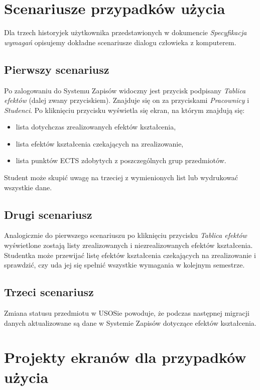\documentclass{article}
\begin{document}
\section{Scenariusze przypadków użycia}
Dla trzech historyjek użytkownika przedstawionych w dokumencie \textit{Specyfikacja wymagań} opisujemy dokładne scenariusze dialogu człowieka z komputerem.

\subsection{Pierwszy scenariusz}
Po zalogowaniu do Systemu Zapisów widoczny jest przycisk podpisany \textit{Tablica efektów} (dalej zwany przyciskiem). 
Znajduje się on za przyciskami \textit{Pracownicy} i \textit{Studenci}. Po kliknięciu przycisku wyświetla się ekran, na którym znajdują się:
\begin{itemize}
	\item lista dotychczas zrealizowanych efektów kształcenia,
	\item lista efektów kształcenia czekających na zrealizowanie,
	\item lista punktów ECTS zdobytych z poszczególnych grup przedmiotów.
\end{itemize}
Student może skupić uwagę na trzeciej z wymienionych list lub wydrukować wszystkie dane.

\subsection{Drugi scenariusz}
Analogicznie do pierwszego scenariuszu po kliknięciu przycisku \textit{Tablica efektów} wyświetlone zostają listy zrealizowanych i niezrealizowanych efektów kształcenia.
Studentka może przewijać listę efektów kształcenia czekających na zrealizowanie i sprawdzić, czy uda jej się spełnić wszystkie wymagania w kolejnym semestrze.

\subsection{Trzeci scenariusz}
Zmiana statusu przedmiotu w USOSie powoduje, że podczas następnej migracji danych aktualizowane są dane w Systemie Zapisów dotyczące efektów kształcenia.


\afterpage{\null\newpage}
\newpage


\section{Projekty ekranów dla przypadków użycia}
\end{document}
